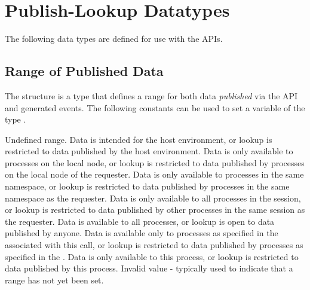 \section{Publish-Lookup Datatypes}

The following data types are defined for use with the  \acp{API}.

\subsection{Range of Published Data}

The  structure is a  type that defines a range for both data \textit{published} via the  \ac{API} and generated events.
The following constants can be used to set a variable of the type .

\begin{constantdesc}
%
Undefined range.
%
Data is intended for the host environment, or lookup is restricted to data published by the host environment.
%
Data is only available to processes on the local node, or lookup is restricted to data published by processes on the local node of the requester.
%
Data is only available to processes in the same namespace, or lookup is restricted to data published by processes in the same namespace as the requester.
%
Data is only available to all processes in the session, or lookup is restricted to data published by other processes in the same session as the requester.
%
Data is available to all processes, or lookup is open to data published by anyone.
%
Data is available only to processes as specified in the  associated with this call, or lookup is restricted to data published by processes as specified in the .
%
Data is only available to this process, or lookup is restricted to data published by this process.
%
Invalid value - typically used to indicate that a range has not yet been set.
%
\end{constantdesc}



